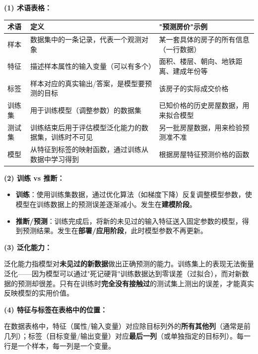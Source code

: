 \documentclass[a4paper,11pt]{ctexart}
\begin{document}
\begin{solutionbox}[参考答案与详细解析]
    \textbf{(1) 术语表格：}
    \begin{center}
    \begin{tabular}{p{2.5cm} p{4.5cm} p{4.5cm}}
        \toprule
        术语 & 定义 & "预测房价"示例 \\
        \midrule
        样本 & 数据集中的一条记录，代表一个观测对象 & 某一套具体的房子的所有信息（一行数据） \\[0.8em]
        特征 & 描述样本属性的输入变量（可以有多个） & 面积、楼层、朝向、地铁距离、建成年份等 \\[0.8em]
        标签 & 样本对应的真实输出/答案，是模型要预测的目标 & 该房子的实际成交价格 \\[0.8em]
        训练集 & 用于训练模型（调整参数）的数据集 & 已知价格的历史房屋数据，用来拟合模型 \\[0.8em]
        测试集 & 训练结束后用于评估模型泛化能力的数据集，训练时不可见 & 另一批房屋数据，用来检验预测准不准 \\[0.8em]
        模型 & 从特征到标签的映射函数，通过训练从数据中学习得到 & 根据房屋特征预测价格的函数 \\
        \bottomrule
    \end{tabular}
    \end{center}

    \textbf{(2) 训练 vs 推断：}
    \begin{itemize}
        \item \textbf{训练}：使用训练集数据，通过优化算法（如梯度下降）反复调整模型参数，使模型在训练数据上的预测误差逐渐减小。发生在\textbf{建模阶段}。
        \item \textbf{推断/预测}：训练完成后，将新的未见过的输入特征送入固定参数的模型，得到预测结果。发生在\textbf{部署/应用阶段}，此时模型参数不再更新。
    \end{itemize}

    \textbf{(3) 泛化能力：}

    泛化能力指模型对\textbf{未见过的新数据}做出正确预测的能力。训练集上的表现无法衡量泛化——因为模型可以通过"死记硬背"训练数据达到零误差（过拟合），而对新数据的预测却很差。只有在训练时\textbf{完全没有接触过}的测试集上测出的误差，才能真实反映模型的实用价值。

    \textbf{(4) 特征与标签在表格中的位置：}

    在数据表格中，特征（属性/输入变量）对应除目标列外的\textbf{所有其他列}（通常是前几列）；标签（目标变量/输出变量）对应\textbf{最后一列}（或单独指定的目标列）。每一行是一个样本，每一列是一个变量。
\end{solutionbox}
\end{document}
